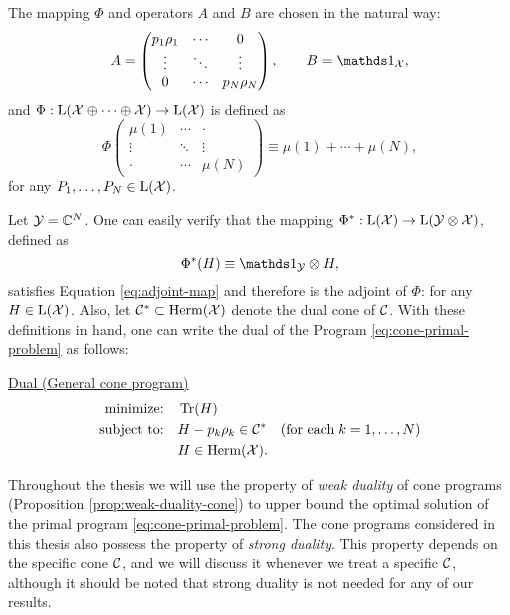 The mapping $\Phi$ and operators $A$ and $B$ 
are chosen in the natural way:
\begin{equation}
  A = \begin{pmatrix}
    p_1 \rho_1 & \cdots & 0 \\
    \vdots & \ddots & \vdots\\
    0 & \cdots & p_N\rho_N
  \end{pmatrix},
  \qquad
  B = \I_{\X},
\end{equation}
and $\Phi : \mathrm{L}(\mathcal{X}\oplus\cdots\oplus\mathcal{X}) \rightarrow \mathrm{L}(\mathcal{X})$ is defined as 
\begin{equation}
  \Phi\begin{pmatrix}
  \mu(1) & \cdots & \cdot \\
  \vdots & \ddots & \vdots\\
  \cdot & \cdots & \mu(N)
  \end{pmatrix}
  \equiv \mu(1)+\cdots+\mu(N),
\end{equation}
for any $P_{1}, \ldots, P_{N} \in \mathrm{L}(\mathcal{X})$.

Let $\mathcal{Y} = \mathbb{C}^{N}$. One can easily verify that the mapping 
$\Phi^{\ast}: \mathrm{L}(\mathcal{X})\rightarrow\mathrm{L}(\mathcal{Y}\otimes\mathcal{X})$,
defined as  
\begin{equation}
  \Phi^{\ast}(H) \equiv \I_{\Y}\otimes H,
\end{equation}
satisfies Equation \eqref{eq:adjoint-map} and therefore is 
the adjoint of $\Phi$:
for any $H\in\mathrm{L}(\mathcal{X})$. 
Also, let $\mathcal{C}^{\ast} \subset \mathrm{Herm}(\mathcal{X})$ denote the dual cone of $\mathcal{C}$.
With these definitions in hand, one can write the dual of the Program 
\eqref{eq:cone-primal-problem} as follows:
\begin{center}
\underline{Dual (General cone program)}
\begin{equation}
  \label{eq:cone-dual-problem}
  \begin{split}
    \text{minimize:} \quad & \operatorname{Tr}(H)\\
    \text{subject to:} \quad & H-p_k\rho_k\in\mathcal{C}^{\ast}
    \quad(\text{for each}\;k = 1,\ldots,N)\\
    \quad & H \in \mathrm{Herm}(\mathcal{X}).
  \end{split}
\end{equation}
\end{center}

Throughout the thesis we will use the property of \emph{weak duality} of cone 
programs (Proposition \ref{prop:weak-duality-cone}) to upper bound the
optimal solution of the primal program \eqref{eq:cone-primal-problem}.
The cone programs considered in this thesis also possess the property 
of \emph{strong duality}. This property depends on the specific cone $\mathcal{C}$,
and we will discuss it whenever we treat a specific $\mathcal{C}$, although
it should be noted that strong duality is not needed for any of our results.

